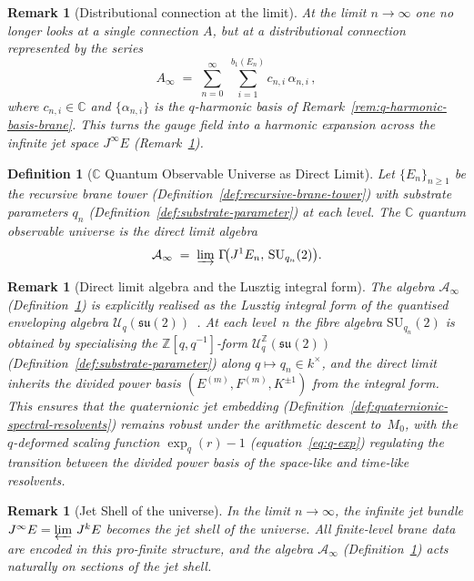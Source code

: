 \documentclass[12pt,a4paper]{report}
\newtheorem{definition}[theorem]{Definition}
\newtheorem{remark}[theorem]{Remark}
\begin{document}
\begin{remark}[Distributional connection at the limit]
\label{rem:distributional-connection}
At the limit $n \to \infty$ one no longer looks at a single connection $A$,
but at a \emph{distributional connection} represented by the series
\[
  A_\infty
  \;=\;
  \sum_{n=0}^{\infty}\;\sum_{i=1}^{b_1(E_n)}
  c_{n,i}\,\alpha_{n,i}\,,
\]
where $c_{n,i} \in \mathbb{C}$ and $\{\alpha_{n,i}\}$ is the $q$-harmonic
basis of Remark~\ref{rem:q-harmonic-basis-brane}.  This turns the gauge field
into a harmonic expansion across the infinite jet space $J^\infty E$
(Remark~\ref{rem:jet-shell}).
\end{remark}



\begin{definition}[$\mathbb{C}$ Quantum Observable Universe as Direct Limit]
\label{def:direct-limit-algebra}
Let $\{E_n\}_{n \geq 1}$ be the recursive brane tower
(Definition~\ref{def:recursive-brane-tower}) with substrate parameters $q_n$
(Definition~\ref{def:substrate-parameter}) at each level.  The
\emph{$\mathbb{C}$ quantum observable universe} is the direct limit algebra
\[
  \mathcal{A}_\infty
  \;=\;
  \varinjlim\,
  \Gamma\!\bigl(J^1 E_n,\, \mathrm{SU}_{q_n}(2)\bigr).
\]
\end{definition}

\begin{remark}[Direct limit algebra and the Lusztig integral form]
\label{rem:direct-limit-lusztig}
The algebra $\mathcal{A}_\infty$
(Definition~\ref{def:direct-limit-algebra}) is explicitly realised as the
Lusztig integral form of the quantised enveloping algebra
$\mathcal{U}_q(\mathfrak{su}(2))$~\cite{lusztig1993}.  At each level~$n$
the fibre algebra $\mathrm{SU}_{q_n}(2)$ is obtained by specialising the
$\mathbb{Z}[q,q^{-1}]$-form
$\mathcal{U}^{\mathbb{Z}}_q(\mathfrak{su}(2))$
(Definition~\ref{def:substrate-parameter}) along
$q \mapsto q_n \in k^{\times}$, and the direct limit inherits the divided
power basis $(E^{(m)}, F^{(m)}, K^{\pm 1})$ from the integral form.  This
ensures that the quaternionic jet embedding
(Definition~\ref{def:quaternionic-spectral-resolvents}) remains robust
under the arithmetic descent to~$M_0$, with the $q$-deformed scaling
function $\exp_q(r) - 1$ (equation~\eqref{eq:q-exp}) regulating the
transition between the divided power basis of the space-like and time-like
resolvents.
\end{remark}

\begin{remark}[Jet Shell of the universe]
\label{rem:jet-shell}
In the limit $n \to \infty$, the infinite jet bundle
$J^\infty E = \varprojlim\, J^k E$ becomes the \emph{jet shell} of the
universe.  All finite-level brane data are encoded in this pro-finite
structure, and the algebra $\mathcal{A}_\infty$
(Definition~\ref{def:direct-limit-algebra}) acts naturally on sections of the
jet shell.
\end{remark}
\end{document}
